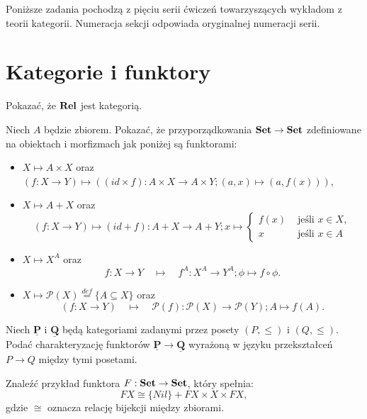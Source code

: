Poniższe zadania pochodzą z pięciu serii ćwiczeń towarzyszących wykładom z teorii kategorii. Numeracja sekcji odpowiada oryginalnej numeracji serii.

\clearpage
\section{Kategorie i funktory}

\begin{zadanie}
    Pokazać, że $\mathbf{Rel}$ jest kategorią. 
\end{zadanie}

\begin{zadanie}
Niech $A$ będzie zbiorem. Pokazać, że przyporządkowania $\mathbf{Set}\to \mathbf{Set}$ zdefiniowane na obiektach i morfizmach jak poniżej są funktorami:
\begin{itemize}
\item $X\mapsto A\times X$ oraz $(f:X\to Y)\mapsto \left ((id \times f):A\times X\to A\times Y; (a,x)\mapsto (a,f(x))\right )$,
\item $X\mapsto A+ X$ oraz $$(f:X\to Y)\mapsto (id + f):A+ X\to A+ Y; x \mapsto \left \{ \begin{array}{cc}f(x)  &\text{ jeśli }x\in X, \\ x &\text{ jeśli }x\in A \end{array}\right. $$
\item $X\mapsto X^A$ oraz 
$$
f:X\to Y\quad \mapsto \quad f^A:X^A\to Y^A; \phi\mapsto f\circ \phi. 
$$
\item $X\mapsto \mathcal{P}(X)\stackrel{def}{=} \{ A\subseteq X \}$ oraz 
$$
(f:X\to Y)\quad \mapsto \quad \mathcal{P}(f):\mathcal{P}(X)\to \mathcal{P}(Y); A\mapsto f(A). 
$$
\end{itemize}
\end{zadanie}

\begin{zadanie}\label{zad:funktory-posety}
Niech $\underline{\mathbf{P}}$ i $\underline{\mathbf{Q}}$ będą kategoriami zadanymi przez posety $(P,\leq)$ i $(Q,\leq)$. Podać charakteryzację funktorów $\underline{\mathbf{P}}\to\underline{\mathbf{Q}}$ wyrażoną w języku przekształceń $P\to Q$ między tymi posetami.
\end{zadanie}

\begin{zadanie}
Znaleźć przykład funktora $F:\mathbf{Set}\to\mathbf{Set}$, który spełnia:
$$
FX \cong \{Nil\} + FX \times X \times FX, 
$$
gdzie $\cong$ oznacza relację bijekcji między zbiorami.
\end{zadanie}

